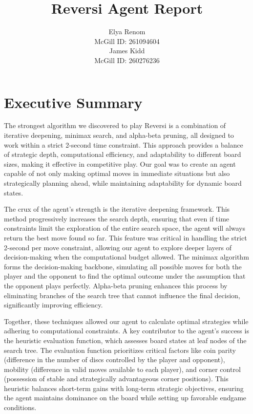 \documentclass[11pt]{article}
\title{Reversi Agent Report}
\author{
    Elya Renom \\ 
    McGill ID: 261094604 \\[1em]
    James Kidd \\ 
    McGill ID: 260276236
}
\date{}
\begin{document}
\maketitle

\section*{Executive Summary}
The strongest algorithm we discovered to play Reversi is a combination of iterative deepening, minimax search, and alpha-beta pruning, all designed to work within a strict 2-second time constraint. This approach provides a balance of strategic depth, computational efficiency, and adaptability to different board sizes, making it effective in competitive play. Our goal was to create an agent capable of not only making optimal moves in immediate situations but also strategically planning ahead, while maintaining adaptability for dynamic board states.

The crux of the agent's strength is the iterative deepening framework. This method progressively increases the search depth, ensuring that even if time constraints limit the exploration of the entire search space, the agent will always return the best move found so far. This feature was critical in handling the strict 2-second per move constraint, allowing our agent to explore deeper layers of decision-making when the computational budget allowed. The minimax algorithm forms the decision-making backbone, simulating all possible moves for both the player and the opponent to find the optimal outcome under the assumption that the opponent plays perfectly. Alpha-beta pruning enhances this process by eliminating branches of the search tree that cannot influence the final decision, significantly improving efficiency. 

Together, these techniques allowed our agent to calculate optimal strategies while adhering to computational constraints. A key contributor to the agent’s success is the heuristic evaluation function, which assesses board states at leaf nodes of the search tree. The evaluation function prioritizes critical factors like coin parity (difference in the number of discs controlled by the player and opponent), mobility (difference in valid moves available to each player), and corner control (possession of stable and strategically advantageous corner positions). This heuristic balances short-term gains with long-term strategic objectives, ensuring the agent maintains dominance on the board while setting up favorable endgame conditions.
\end{document}
